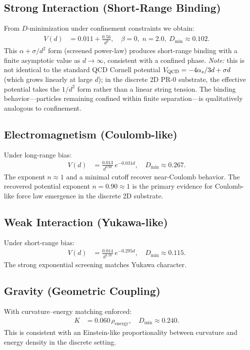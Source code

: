 \documentclass[12pt]{article}
\begin{document}
\subsection{Strong Interaction (Short-Range Binding)}
From $D$-minimization under confinement constraints we obtain:
\begin{align*}
V(d) &= 0.011 + \frac{0.56}{d^2},\quad \beta=0,\; n=2.0,\; D_{\min} \approx 0.102.
\end{align*}
This $\alpha + \sigma/d^2$ form (screened power-law) produces short-range binding with a finite asymptotic value as $d\to\infty$, consistent with a confined phase. \textit{Note:} this is not identical to the standard QCD Cornell potential $V_{\rm QCD}=-4\alpha_s/3d + \sigma d$ (which grows linearly at large $d$); in the discrete 2D PR-0 substrate, the effective potential takes the $1/d^2$ form rather than a linear string tension. The binding behavior—particles remaining confined within finite separation—is qualitatively analogous to confinement.

\subsection{Electromagnetism (Coulomb-like)}
Under long-range bias:
\begin{align*}
V(d) &= \frac{0.013}{d^{0.90}}\, e^{-0.031 d},\quad D_{\min} \approx 0.267.
\end{align*}
The exponent $n\approx 1$ and a minimal cutoff recover near-Coulomb behavior.
The recovered potential exponent $n=0.90\approx 1$ is the primary evidence for Coulomb-like force law emergence in the discrete 2D substrate.

\subsection{Weak Interaction (Yukawa-like)}
Under short-range bias:
\begin{align*}
V(d) &= \frac{0.014}{d^{1.16}}\, e^{-0.295 d},\quad D_{\min} \approx 0.115.
\end{align*}
The strong exponential screening matches Yukawa character.

\subsection{Gravity (Geometric Coupling)}
With curvature--energy matching enforced:
\begin{align*}
K &= 0.060\, \rho_{\mathrm{energy}},\quad D_{\min} \approx 0.240.
\end{align*}
This is consistent with an Einstein-like proportionality between curvature and energy density in the discrete setting.
\end{document}

